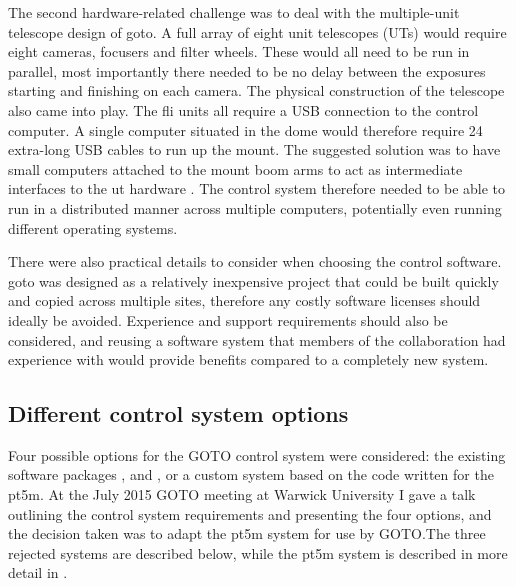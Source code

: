 \begin{colsection}
\begin{colsection}
The second hardware-related challenge was to deal with the multiple-unit telescope design of \gls{goto}. A full array of eight unit telescopes (UTs) would require eight cameras, focusers and filter wheels. These would all need to be run in parallel, most importantly there needed to be no delay between the exposures starting and finishing on each camera. The physical construction of the telescope also came into play. The \gls{fli} units all require a USB connection to the control computer. A single computer situated in the dome would therefore require 24 extra-long USB cables to run up the mount. The suggested solution was to have small computers attached to the mount boom arms to act as intermediate interfaces to the \gls{ut} hardware . The control system therefore needed to be able to run in a distributed manner across multiple computers, potentially even running different operating systems.

There were also practical details to consider when choosing the control software. \gls{goto} was designed as a relatively inexpensive project that could be built quickly and copied across multiple sites, therefore any costly software licenses should ideally be avoided. Experience and support requirements should also be considered, and reusing a software system that members of the collaboration had experience with would provide benefits compared to a completely new system.

\end{colsection}


\subsection{Different control system options}
\label{sec:control_options}
\begin{colsection}

Four possible options for the GOTO control system were considered: the existing software packages ,  and , or a custom system based on the code written for the \gls{pt5m}. At the July 2015 GOTO meeting at Warwick University I gave a talk outlining the control system requirements and presenting the four options, and the decision taken was to adapt the \gls{pt5m} system for use by GOTO.\@ The three rejected systems are described below, while the \gls{pt5m} system is described in more detail in .


\end{colsection}
\end{colsection}
